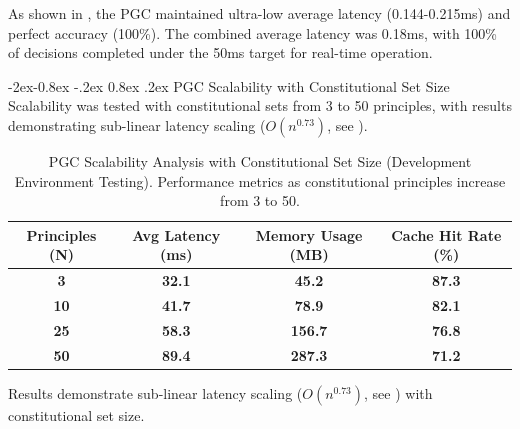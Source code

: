 \documentclass[manuscript,screen,9pt]{acmart}
\makeatletter
\renewcommand\subsubsection{\@startsection{subsubsection}{3}{\z@}%
  {-2ex\@plus -0.8ex \@minus -.2ex}%
  {0.8ex \@plus .2ex}%
  {\normalfont\normalsize\bfseries}}
\newcommand{\tablesize}{\footnotesize}
\newcommand{\tablenumfmt}[1]{\textbf{#1}}
\newcommand{\tableheader}[1]{\textbf{#1}}
\makeatother
\begin{document}
As shown in , the PGC maintained ultra-low average latency (0.144-0.215ms) and perfect accuracy (100\%). The combined average latency was 0.18ms, with 100\% of decisions completed under the 50ms target for real-time operation.

\subsubsection{PGC Scalability with Constitutional Set Size}
Scalability was tested with constitutional sets from 3 to 50 principles, with results demonstrating sub-linear latency scaling ($O(n^{0.73})$, see ).
\begin{table}[htbp]
	\centering
	\caption{PGC Scalability Analysis with Constitutional Set Size (Development Environment Testing). Performance metrics as constitutional principles increase from 3 to 50.}
	\label{tab:pgc_scalability}
	\tablesize
	\begin{tabular}{@{}cccc@{}}
		\toprule
		\tableheader{Principles (N)} & \tableheader{Avg Latency (ms)} & \tableheader{Memory Usage (MB)} & \tableheader{Cache Hit Rate (\%)} \\
		\midrule
		\tablenumfmt{3}              & \tablenumfmt{32.1}             & \tablenumfmt{45.2}              & \tablenumfmt{87.3}                \\
		\tablenumfmt{10}             & \tablenumfmt{41.7}             & \tablenumfmt{78.9}              & \tablenumfmt{82.1}                \\
		\tablenumfmt{25}             & \tablenumfmt{58.3}             & \tablenumfmt{156.7}             & \tablenumfmt{76.8}                \\
		\tablenumfmt{50}             & \tablenumfmt{89.4}             & \tablenumfmt{287.3}             & \tablenumfmt{71.2}                \\
		\bottomrule
	\end{tabular}
\end{table}
Results demonstrate sub-linear latency scaling ($O(n^{0.73})$, see ) with constitutional set size.
\end{document}
